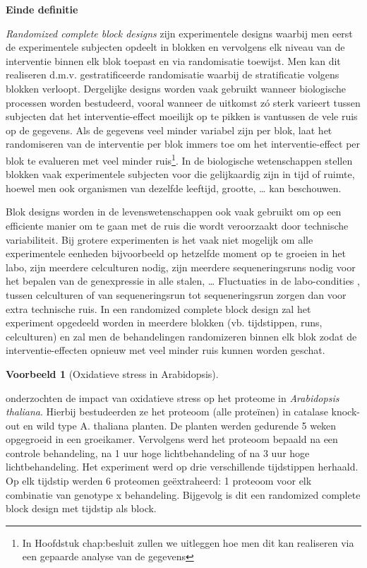 \documentclass[
  12pt,dutch,coursenotes]{book}
\theoremstyle{definition}
\theoremstyle{definition}
\newtheorem{example}{Voorbeeld}[chapter]
\theoremstyle{definition}
\theoremstyle{remark}
\begin{document}
\textbf{Einde definitie}

\emph{Randomized complete block designs} zijn experimentele designs waarbij men eerst de experimentele subjecten opdeelt in blokken en vervolgens elk niveau van de interventie binnen elk blok toepast en via randomisatie toewijst. Men kan dit realiseren d.m.v. gestratificeerde randomisatie waarbij de stratificatie volgens blokken verloopt. Dergelijke designs worden vaak gebruikt wanneer biologische processen worden bestudeerd, vooral wanneer de uitkomst zó sterk varieert tussen subjecten dat het interventie-effect moeilijk op te pikken is vantussen de vele ruis op de gegevens. Als de gegevens veel minder variabel zijn per blok, laat het randomiseren van de interventie per blok immers toe om het interventie-effect per blok te evalueren met veel minder ruis\footnote{In Hoofdstuk chap:besluit zullen we uitleggen hoe men dit kan realiseren via een gepaarde analyse van de gegevens}. In de biologische wetenschappen stellen blokken vaak experimentele subjecten voor die gelijkaardig zijn in tijd of ruimte, hoewel men ook organismen van dezelfde leeftijd, grootte, \ldots{} kan beschouwen.

Blok designs worden in de levenswetenschappen ook vaak gebruikt om op een efficiente manier om te gaan met de ruis die wordt veroorzaakt door technische variabiliteit. Bij grotere experimenten is het vaak niet mogelijk om alle experimentele eenheden bijvoorbeeld op hetzelfde moment op te groeien in het labo, zijn meerdere celculturen nodig, zijn meerdere sequeneringsruns nodig voor het bepalen van de genexpressie in alle stalen, \ldots{} Fluctuaties in de labo-condities , tussen celculturen of van sequeneringsrun tot sequeneringsrun zorgen dan voor extra technische ruis. In een randomized complete block design zal het experiment opgedeeld worden in meerdere blokken (vb. tijdstippen, runs, celculturen) en zal men de behandelingen randomizeren binnen elk blok zodat de interventie-effecten opnieuw met veel minder ruis kunnen worden geschat.

\begin{example}[Oxidatieve stress in Arabidopsis]
\protect\hypertarget{exm:unnamed-chunk-73}{}{\label{exm:unnamed-chunk-73} \iffalse (Oxidatieve stress in Arabidopsis) \fi{} }
\end{example}
\citet{Jacques2015} onderzochten de impact van oxidatieve stress op het proteome in \emph{Arabidopsis thaliana}. Hierbij bestudeerden ze het proteoom (alle proteïnen) in catalase knock-out en wild type A. thaliana planten. De planten werden gedurende 5 weken opgegroeid in een groeikamer. Vervolgens werd het proteoom bepaald na een controle behandeling, na 1 uur hoge lichtbehandeling of na 3 uur hoge lichtbehandeling. Het experiment werd op drie verschillende tijdstippen herhaald. Op elk tijdstip werden 6 proteomen geëxtraheerd: 1 proteoom voor elk combinatie van genotype x behandeling. Bijgevolg is dit een randomized complete block design met tijdstip als block.
\end{document}
